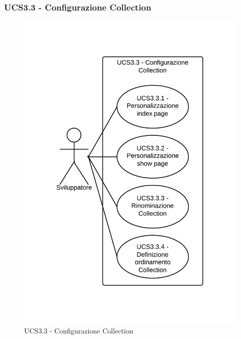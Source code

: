 \subsubsection{UCS3.3 - Configurazione Collection} 
    \begin{center}
    \begin{figure}[H]
      \includegraphics[scale=0.16]{UML/UCS3.3 - Configurazione Collection.png}
      \caption{UCS3.3 - Configurazione Collection} 
    \end{figure}
    \end{center}
    
